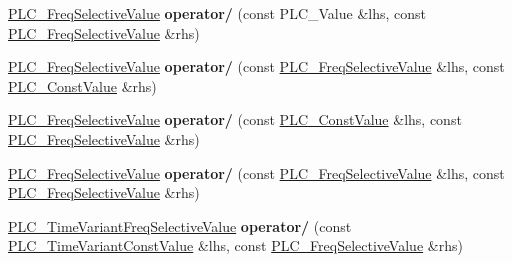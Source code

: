 \begin{DoxyCompactItemize}
\item 
\hypertarget{classns3_1_1PLC__FreqSelectiveValue_a381dd860610be36daefe607c5ea57aa0}{\hyperlink{classns3_1_1PLC__FreqSelectiveValue}{\-P\-L\-C\-\_\-\-Freq\-Selective\-Value} {\bfseries operator/} (const \-P\-L\-C\-\_\-\-Value \&lhs, const \hyperlink{classns3_1_1PLC__FreqSelectiveValue}{\-P\-L\-C\-\_\-\-Freq\-Selective\-Value} \&rhs)}\label{classns3_1_1PLC__FreqSelectiveValue_a381dd860610be36daefe607c5ea57aa0}

\item 
\hypertarget{classns3_1_1PLC__FreqSelectiveValue_a36a5a366c7818cd7b3ac067e84a59685}{\hyperlink{classns3_1_1PLC__FreqSelectiveValue}{\-P\-L\-C\-\_\-\-Freq\-Selective\-Value} {\bfseries operator/} (const \hyperlink{classns3_1_1PLC__FreqSelectiveValue}{\-P\-L\-C\-\_\-\-Freq\-Selective\-Value} \&lhs, const \hyperlink{classns3_1_1PLC__ConstValue}{\-P\-L\-C\-\_\-\-Const\-Value} \&rhs)}\label{classns3_1_1PLC__FreqSelectiveValue_a36a5a366c7818cd7b3ac067e84a59685}

\item 
\hypertarget{classns3_1_1PLC__FreqSelectiveValue_a86a0696c5c77313627b0c95276cc6761}{\hyperlink{classns3_1_1PLC__FreqSelectiveValue}{\-P\-L\-C\-\_\-\-Freq\-Selective\-Value} {\bfseries operator/} (const \hyperlink{classns3_1_1PLC__ConstValue}{\-P\-L\-C\-\_\-\-Const\-Value} \&lhs, const \hyperlink{classns3_1_1PLC__FreqSelectiveValue}{\-P\-L\-C\-\_\-\-Freq\-Selective\-Value} \&rhs)}\label{classns3_1_1PLC__FreqSelectiveValue_a86a0696c5c77313627b0c95276cc6761}

\item 
\hypertarget{classns3_1_1PLC__FreqSelectiveValue_a23f9fe7f15c537850e07161166947b34}{\hyperlink{classns3_1_1PLC__FreqSelectiveValue}{\-P\-L\-C\-\_\-\-Freq\-Selective\-Value} {\bfseries operator/} (const \hyperlink{classns3_1_1PLC__FreqSelectiveValue}{\-P\-L\-C\-\_\-\-Freq\-Selective\-Value} \&lhs, const \hyperlink{classns3_1_1PLC__FreqSelectiveValue}{\-P\-L\-C\-\_\-\-Freq\-Selective\-Value} \&rhs)}\label{classns3_1_1PLC__FreqSelectiveValue_a23f9fe7f15c537850e07161166947b34}

\item 
\hypertarget{classns3_1_1PLC__FreqSelectiveValue_a0655c0e755a478cc0b4f5a1c23c9efd9}{\hyperlink{classns3_1_1PLC__TimeVariantFreqSelectiveValue}{\-P\-L\-C\-\_\-\-Time\-Variant\-Freq\-Selective\-Value} {\bfseries operator/} (const \hyperlink{classns3_1_1PLC__TimeVariantConstValue}{\-P\-L\-C\-\_\-\-Time\-Variant\-Const\-Value} \&lhs, const \hyperlink{classns3_1_1PLC__FreqSelectiveValue}{\-P\-L\-C\-\_\-\-Freq\-Selective\-Value} \&rhs)}\label{classns3_1_1PLC__FreqSelectiveValue_a0655c0e755a478cc0b4f5a1c23c9efd9}


\end{DoxyCompactItemize}
